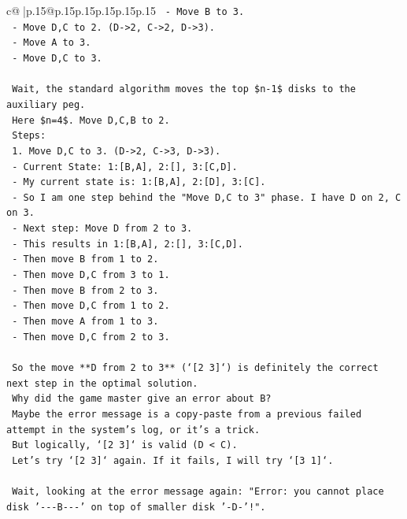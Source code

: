 \documentclass{article}
\begin{document}
{\begin{supertabular}{c@{$\;$}|p{.15\linewidth}@{}p{.15\linewidth}p{.15\linewidth}p{.15\linewidth}p{.15\linewidth}p{.15\linewidth}}
{{{\texttt{      {-} Move B to 3.} \\
\texttt{      {-} Move D,C to 2. (D{-}>2, C{-}>2, D{-}>3).} \\
\texttt{      {-} Move A to 3.} \\
\texttt{      {-} Move D,C to 3.} \\
\\ 
\texttt{   Wait, the standard algorithm moves the top \$n{-}1\$ disks to the auxiliary peg.} \\
\texttt{   Here \$n=4\$. Move D,C,B to 2.} \\
\texttt{   Steps:} \\
\texttt{   1. Move D,C to 3. (D{-}>2, C{-}>3, D{-}>3).} \\
\texttt{      {-} Current State: 1:{[}B,A{]}, 2:{[}{]}, 3:{[}C,D{]}.} \\
\texttt{      {-} My current state is: 1:{[}B,A{]}, 2:{[}D{]}, 3:{[}C{]}.} \\
\texttt{      {-} So I am one step behind the "Move D,C to 3" phase. I have D on 2, C on 3.} \\
\texttt{      {-} Next step: Move D from 2 to 3.} \\
\texttt{      {-} This results in 1:{[}B,A{]}, 2:{[}{]}, 3:{[}C,D{]}.} \\
\texttt{      {-} Then move B from 1 to 2.} \\
\texttt{      {-} Then move D,C from 3 to 1.} \\
\texttt{      {-} Then move B from 2 to 3.} \\
\texttt{      {-} Then move D,C from 1 to 2.} \\
\texttt{      {-} Then move A from 1 to 3.} \\
\texttt{      {-} Then move D,C from 2 to 3.} \\
\\ 
\texttt{   So the move **D from 2 to 3** (`{[}2 3{]}`) is definitely the correct next step in the optimal solution.} \\
\texttt{   Why did the game master give an error about B?} \\
\texttt{   Maybe the error message is a copy{-}paste from a previous failed attempt in the system's log, or it's a trick.} \\
\texttt{   But logically, `{[}2 3{]}` is valid (D < C).} \\
\texttt{   Let's try `{[}2 3{]}` again. If it fails, I will try `{[}3 1{]}`.} \\
\\ 
\texttt{   Wait, looking at the error message again: "Error: you cannot place disk '{-}{-}{-}B{-}{-}{-}' on top of smaller disk '{-}D{-}'!".} \\
}}}
\end{supertabular}}
\end{document}
